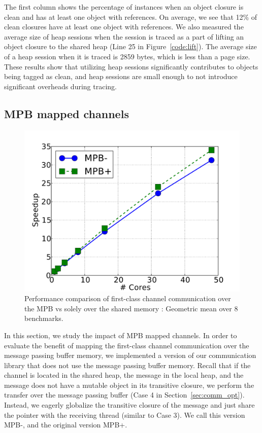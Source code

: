 The first column shows the percentage of instances when an object closure is
clean and has at least one object with  references. On average,
we see that 12\% of clean closures have at least one object with
 references. We also measured the average size of heap sessions
when the session is traced as a part of lifting an object closure to the shared
heap (Line 25 in Figure~\ref{code:lift}). The average size of a heap session
when it is traced is 2859 bytes, which is less than a page size. These results
show that utilizing heap sessions significantly contributes to objects being
tagged as clean, and heap sessions are small enough to not introduce
significant overheads during tracing.


\subsection{MPB mapped channels}

\begin{figure}[ht]
\centering
\includegraphics[width=1\textwidth]{Graphs/speedup_scc_chan}
\caption{Performance comparison of first-class channel communication over the
MPB  vs solely over the shared memory : Geometric mean
over 8 benchmarks.}
\label{fig:speedup_scc_chan}
\end{figure}


In this section, we study the impact of MPB mapped channels. In order to
evaluate the benefit of mapping the first-class channel communication over the
message passing buffer memory, we implemented a version of our communication
library that does not use the message passing buffer memory. Recall that if the
channel is located in the shared heap, the message in the local heap, and the
message does not have a mutable object in its transitive closure, we perform
the transfer over the message passing buffer (Case 4 in
Section~\ref{sec:comm_opt}). Instead, we eagerly globalize the transitive
closure of the message and just share the pointer with the receiving thread
(similar to Case 3). We call this version MPB-, and the original version MPB+.

